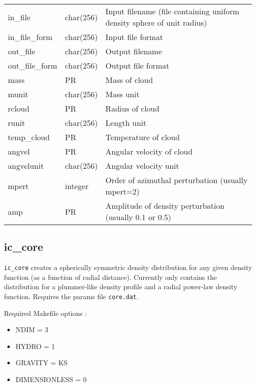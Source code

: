 \documentclass[a4paper]{article}
\newcommand{\var}[1]{\texttt{#1}}
\begin{document}
\tabletail{\hline}
\tablelasttail{\hline}
\begin{center}
\begin{supertabular}{|p{3cm}|p{2cm}|p{8cm}|}
in\_file         & char(256) & Input filename (file containing uniform density sphere of unit radius) \\
in\_file\_form   & char(256) & Input file format \\
out\_file        & char(256) & Output filename \\
out\_file\_form  & char(256) & Output file format \\
mass             & PR       & Mass of cloud \\
munit            & char(256) & Mass unit \\
rcloud           & PR       & Radius of cloud \\
runit            & char(256) & Length unit \\
temp\_cloud      & PR       & Temperature of cloud \\
angvel           & PR       & Angular velocity of cloud \\
angvelunit       & char(256) & Angular velocity unit \\
mpert            & integer  & Order of azimuthal perturbation (usually mpert=2) \\
amp              & PR       & Amplitude of density perturbation (usually 0.1 or 0.5)\\
\end{supertabular}
\end{center}


\newpage


\subsection{ic\_core}
\var{ic\_core} creates a spherically symmetric density distribution for any given density function (as a function of radial distance).  Currently only contains the distribution for a plummer-like density profile and a radial power-law density function.  Requires the params file \var{core.dat}. \newline

\noindent Required Makefile options :
\begin{itemize}
\item NDIM = 3
\item HYDRO = 1
\item GRAVITY = KS
\item DIMENSIONLESS = 0
\end{itemize}
\end{document}
